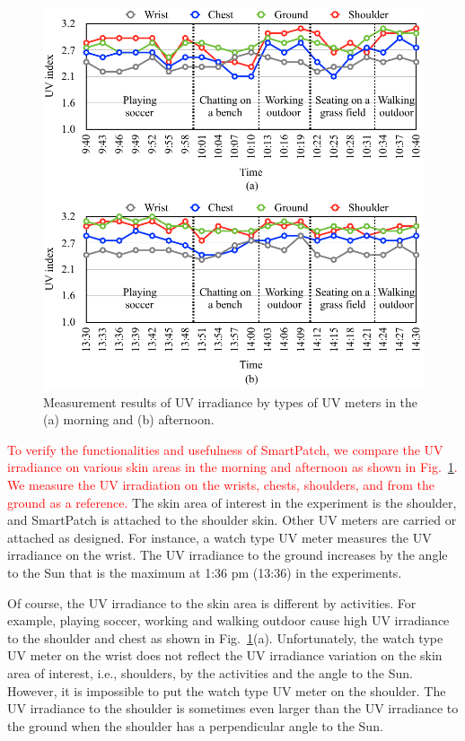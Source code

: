 \documentclass[journal]{IEEEtran}
\begin{document}
\begin{figure}
\centering
\includegraphics[width=1.0\hsize]{Figures/UV_measure.pdf}
\caption{Measurement results of UV irradiance by types of UV meters in the (a) morning and (b) afternoon.}
\label{fig:UV_measure}
\end{figure}

\textcolor{red}{To verify the functionalities and usefulness of SmartPatch, we compare the UV irradiance on various skin areas in the morning and afternoon as shown in Fig.~\ref{fig:UV_measure}. We measure the UV irradiation on the wrists, chests, shoulders, and from the ground as a reference.}
The skin area of interest in the experiment is the shoulder, and SmartPatch is attached to the shoulder skin. Other UV meters are carried or attached as designed. For instance, a watch type UV meter measures the UV irradiance on the wrist. The UV irradiance to the ground increases by the angle to the Sun that is the maximum at 1:36 pm (13:36) in the experiments.

Of course, the UV irradiance to the skin area is different by activities.
For example, playing soccer, working and walking outdoor cause high UV irradiance to the shoulder and chest as shown in Fig.~\ref{fig:UV_measure}(a).
Unfortunately, the watch type UV meter on the wrist does not reflect the UV irradiance variation on the skin area of interest, i.e., shoulders, by the activities and the angle to the Sun.
However, it is impossible to put the watch type UV meter on the shoulder.
The UV irradiance to the shoulder is sometimes even larger than the UV irradiance to the ground when the shoulder has a perpendicular angle to the Sun.
\end{document}
